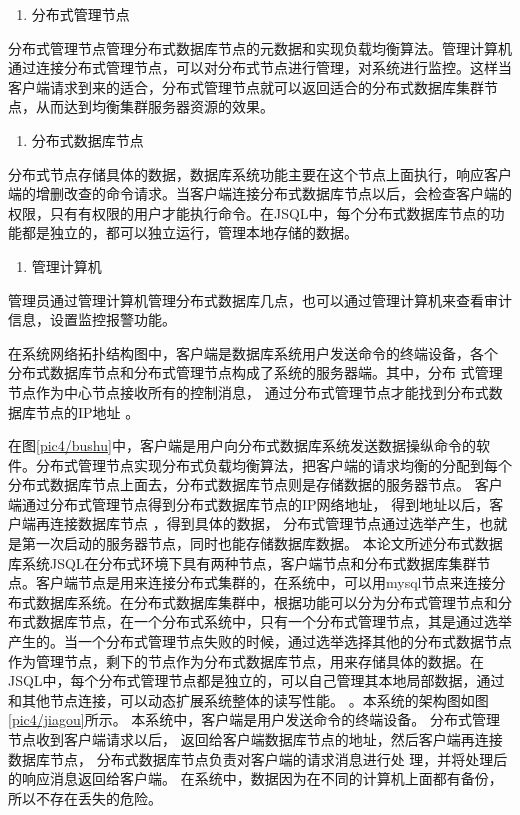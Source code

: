 	\begin{enumerate}[resume]
		\item 分布式管理节点
	\end{enumerate}

	分布式管理节点管理分布式数据库节点的元数据和实现负载均衡算法。管理计算机通过连接分布式管理节点，可以对分布式节点进行管理，对系统进行监控。这样当客户端请求到来的适合，分布式管理节点就可以返回适合的分布式数据库集群节点，从而达到均衡集群服务器资源的效果。

	\begin{enumerate}[resume]
		\item 分布式数据库节点
	\end{enumerate}

	分布式节点存储具体的数据，数据库系统功能主要在这个节点上面执行，响应客户端的增删改查的命令请求。当客户端连接分布式数据库节点以后，会检查客户端的权限，只有有权限的用户才能执行命令。在JSQL中，每个分布式数据库节点的功能都是独立的，都可以独立运行，管理本地存储的数据。

	\begin{enumerate}[resume]
		\item 管理计算机
	\end{enumerate}

	管理员通过管理计算机管理分布式数据库几点，也可以通过管理计算机来查看审计信息，设置监控报警功能。


在系统网络拓扑结构图中，客户端是数据库系统用户发送命令的终端设备，各个
分布式数据库节点和分布式管理节点构成了系统的服务器端。其中，分布
式管理节点作为中心节点接收所有的控制消息，
通过分布式管理节点才能找到分布式数据库节点的IP地址
。

在图\ref{pic4/bushu}中，客户端是用户向分布式数据库系统发送数据操纵命令的软件。分布式管理节点实现分布式负载均衡算法，把客户端的请求均衡的分配到每个分布式数据库节点上面去，分布式数据库节点则是存储数据的服务器节点。
客户端通过分布式管理节点得到分布式数据库节点的IP网络地址，
得到地址以后，客户端再连接数据库节点
，得到具体的数据，
分布式管理节点通过选举产生，也就是第一次启动的服务器节点，同时也能存储数据库数据。
本论文所述分布式数据库系统JSQL在分布式环境下具有两种节点，客户端节点和分布式数据库集群节点。客户端节点是用来连接分布式集群的，在系统中，可以用mysql节点来连接分布式数据库系统。在分布式数据库集群中，根据功能可以分为分布式管理节点和分布式数据库节点，在一个分布式系统中，只有一个分布式管理节点，其是通过选举产生的。当一个分布式管理节点失败的时候，通过选举选择其他的分布式数据节点作为管理节点，剩下的节点作为分布式数据库节点，用来存储具体的数据。在JSQL中，每个分布式管理节点都是独立的，可以自己管理其本地局部数据，通过和其他节点连接，可以动态扩展系统整体的读写性能。
。本系统的架构图如图\ref{pic4/jiagou}所示。
本系统中，客户端是用户发送命令的终端设备。
分布式管理节点收到客户端请求以后，
返回给客户端数据库节点的地址，然后客户端再连接数据库节点，
分布式数据库节点负责对客户端的请求消息进行处
理，并将处理后的响应消息返回给客户端。
在系统中，数据因为在不同的计算机上面都有备份，所以不存在丢失的危险。
